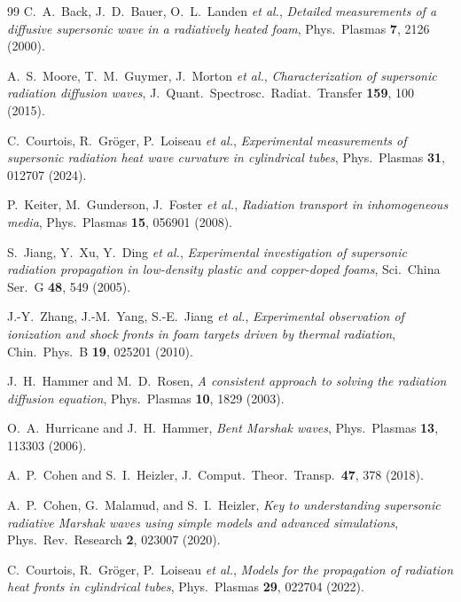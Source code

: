\documentclass[prl, twocolumn, superscriptaddress, amsmath, amssymb, reprint]{revtex4-2}
\begin{document}
\begin{thebibliography}{99}
C.~A.~Back, J.~D.~Bauer, O.~L.~Landen \textit{et al.},
\textit{Detailed measurements of a diffusive supersonic wave in a radiatively heated foam},
Phys.\ Plasmas \textbf{7}, 2126 (2000).

A.~S.~Moore, T.~M.~Guymer, J.~Morton \textit{et al.},
\textit{Characterization of supersonic radiation diffusion waves},
J.\ Quant.\ Spectrosc.\ Radiat.\ Transfer \textbf{159}, 100 (2015).

C.~Courtois, R.~Gr\"oger, P.~Loiseau \textit{et al.},
\textit{Experimental measurements of supersonic radiation heat wave curvature in cylindrical tubes},
Phys.\ Plasmas \textbf{31}, 012707 (2024).

P.~Keiter, M.~Gunderson, J.~Foster \textit{et al.},
\textit{Radiation transport in inhomogeneous media},
Phys.\ Plasmas \textbf{15}, 056901 (2008).

S.~Jiang, Y.~Xu, Y.~Ding \textit{et al.},
\textit{Experimental investigation of supersonic radiation propagation in low-density plastic and copper-doped foams},
Sci.\ China Ser.\ G \textbf{48}, 549 (2005).

J.-Y.~Zhang, J.-M.~Yang, S.-E.~Jiang \textit{et al.},
\textit{Experimental observation of ionization and shock fronts in foam targets driven by thermal radiation},
Chin.\ Phys.\ B \textbf{19}, 025201 (2010).

J.~H.~Hammer and M.~D.~Rosen,
\textit{A consistent approach to solving the radiation diffusion equation},
Phys.\ Plasmas \textbf{10}, 1829 (2003).

O.~A.~Hurricane and J.~H.~Hammer,
\textit{Bent Marshak waves},
Phys.\ Plasmas \textbf{13}, 113303 (2006).

A.~P.~Cohen and S.~I.~Heizler,
J.\ Comput.\ Theor.\ Transp.\ \textbf{47}, 378 (2018).

A.~P.~Cohen, G.~Malamud, and S.~I.~Heizler,
\textit{Key to understanding supersonic radiative Marshak waves using simple models and advanced simulations},
Phys.\ Rev.\ Research \textbf{2}, 023007 (2020).

C.~Courtois, R.~Gr\"oger, P.~Loiseau \textit{et al.},
\textit{Models for the propagation of radiation heat fronts in cylindrical tubes},
Phys.\ Plasmas \textbf{29}, 022704 (2022).



\end{thebibliography}
\end{document}
